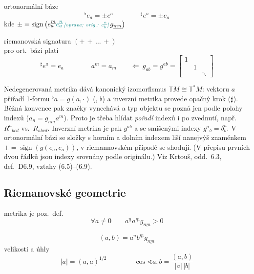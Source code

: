 ortonormální báze
\[
  {}^\flat e_a = \pm e^a \qquad\qquad {}^\sharp e^a = \pm e_a
\]
\quad kde $\pm = \operatorname{sign}\big(e^{\underline{m}}_a \oprava{e^{\underline{n}}_a}{e^{\underline{n}}_b}\,g_{\underline{mn}}\big)$

riemanovská signatura $(+\,+\,\dots\,+)$ \\
\quad pro ort.\ bázi platí
\[
  {}^\sharp e^a = e_a \qquad\qquad a^m = a_m \qquad \Leftarrow\ g_{ab} = g^{ab} = \begin{bmatrix}1 & & \\ & 1 & \\ & & \ddots\end{bmatrix}
\]

\begin{vysvetleni}
Nedegenerovaná metrika dává kanonický izomorfismus $\mathbb{T}M\cong\mathbb{T}^*M$: vektoru $a$ přiřadí 1-formu ${}^\flat a=g(a,\cdot)$ (, $\flat$) a inverzní metrika provede opačný krok ($\sharp$). Běžná konvence pak značky vynechává a typ objektu se pozná jen podle polohy indexů ($a_n=g_{nm}a^m$). Proto je třeba hlídat \emph{pořadí} indexů i po zvednutí, např.\ $R^a{}_{bcd}$ vs.\ $R_{abcd}$. Inverzní metrika je pak $g^{ab}$ a se smíšenými indexy $g^a{}_b=\delta^a_b$.
V ortonormální bázi se složky s horním a dolním indexem liší nanejvýš znaménkem $\pm=\operatorname{sign}(g(e_a,e_a))$, v riemannovském případě se shodují. (V přepisu prvních dvou řádků jsou indexy srovnány podle originálu.)
Viz Krtouš, odd.~6.3, def.~D6.9, vztahy (6.5)--(6.9).
\end{vysvetleni}

\subsection{Riemanovské geometrie} 

\begin{minipage}{0.6\textwidth}
\begin{definice}
metrika je poz.\ def.
\[ \forall a\neq 0 \qquad a^{\underline{n}}a^{\underline{m}}g_{\underline{nm}} > 0 \]
\end{definice}
\[ (a,b) = a^{\underline{n}}b^{\underline{m}}g_{\underline{nm}} \]
velikosti a úhly
\[
  |a| = (a,a)^{1/2} \qquad\qquad \cos\sphericalangle a,b = \frac{(a,b)}{|a|\,|b|}
\]
\end{minipage}
\hfill
\begin{minipage}{0.35\textwidth}
\end{minipage}

